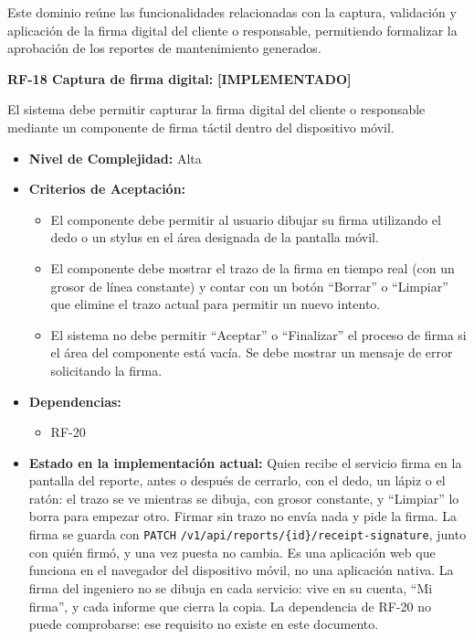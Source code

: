 \documentclass[12pt,a4paper]{article}
\newcommand{\ruta}[1]{\nolinkurl{#1}}
\newcommand{\estadoImplementado}{\textcolor{mainRed}{\textbf{[IMPLEMENTADO]}}}
\begin{document}
Este dominio reúne las funcionalidades relacionadas con la captura, validación y aplicación de la firma digital del cliente o responsable, permitiendo formalizar la aprobación de los reportes de mantenimiento generados.

\textbf{RF-18 Captura de firma digital:} \estadoImplementado{}

El sistema debe permitir capturar la firma digital del cliente o responsable mediante un componente de firma táctil dentro del dispositivo móvil.

\begin{itemize}
  \item \textbf{Nivel de Complejidad:} Alta

  \item \textbf{Criterios de Aceptación:}
  \begin{itemize}
    \item El componente debe permitir al usuario dibujar su firma utilizando el dedo o un stylus en el área designada de la pantalla móvil.
    \item El componente debe mostrar el trazo de la firma en tiempo real (con un grosor de línea constante) y contar con un botón ``Borrar'' o ``Limpiar'' que elimine el trazo actual para permitir un nuevo intento.
    \item El sistema no debe permitir ``Aceptar'' o ``Finalizar'' el proceso de firma si el área del componente está vacía. Se debe mostrar un mensaje de error solicitando la firma.
  \end{itemize}

  \item \textbf{Dependencias:}
  \begin{itemize}
    \item RF-20
  \end{itemize}

  \item \textbf{Estado en la implementación actual:} Quien recibe el servicio firma en la pantalla del reporte, antes o después de cerrarlo, con el dedo, un lápiz o el ratón: el trazo se ve mientras se dibuja, con grosor constante, y ``Limpiar'' lo borra para empezar otro. Firmar sin trazo no envía nada y pide la firma. La firma se guarda con \texttt{PATCH} \ruta{/v1/api/reports/{id}/receipt-signature}, junto con quién firmó, y una vez puesta no cambia. Es una aplicación web que funciona en el navegador del dispositivo móvil, no una aplicación nativa. La firma del ingeniero no se dibuja en cada servicio: vive en su cuenta, ``Mi firma'', y cada informe que cierra la copia. La dependencia de RF-20 no puede comprobarse: ese requisito no existe en este documento.
\end{itemize}
\end{document}
